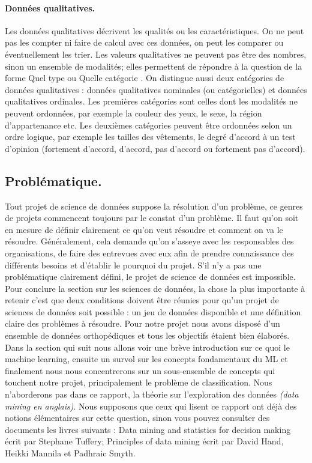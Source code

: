\documentclass[12pt, french]{report}
\begin{document}
\paragraph{Données qualitatives.} 
Les données qualitatives décrivent les qualités ou les caractéristiques. On ne peut pas les compter ni faire de calcul avec ces données, on peut les comparer ou éventuellement les trier. Les valeurs qualitatives ne peuvent pas être des nombres, sinon un ensemble de modalités; elles permettent de répondre à la question de la forme \guillemotleft Quel type \guillemotright ou \guillemotleft Quelle catégorie \guillemotright. On distingue aussi deux catégories de données qualitatives : données qualitatives nominales (ou catégorielles) et données qualitatives ordinales. Les premières catégories sont celles dont les modalités ne peuvent ordonnées, par exemple la couleur des yeux, le sexe, la région d'appartenance etc. Les deuxièmes catégories peuvent être ordonnées selon un ordre logique, par exemple les tailles des vêtements, le degré d'accord à un test d'opinion (fortement d'accord, d'accord, pas d'accord ou fortement pas d'accord).

\subsection{Problématique.}
Tout projet de science de données suppose la résolution d'un problème, ce genres de projets commencent toujours par le constat d'un problème. Il faut qu'on soit en mesure de définir clairement ce qu'on veut résoudre et comment on va le résoudre. Généralement, cela demande qu'on s'asseye avec les responsables des organisations, de faire des entrevues avec eux afin de prendre connaissance des différents besoins et d'établir le pourquoi du projet. S'il n'y a pas une problématique clairement défini, le projet de science de données est impossible. \\

Pour conclure la section sur les sciences de données, la chose la plus importante à retenir c'est que deux conditions doivent être réunies pour qu'un projet de sciences de données soit possible : un jeu de données disponible et une définition claire des problèmes à résoudre. Pour notre projet nous avons disposé d'un ensemble de données orthopédiques et tous les objectifs étaient bien élaborés. \\

Dans la section qui suit nous allons voir une brève introduction sur ce quoi le machine learning, ensuite un survol sur les concepts fondamentaux du ML et finalement nous nous concentrerons sur un sous-ensemble de concepts qui touchent notre projet, principalement le problème de classification. Nous n'aborderons pas dans ce rapport, la théorie sur l'exploration des données \textit{(data mining en anglais)}. Nous supposons que ceux qui lisent ce rapport ont déjà des notions élémentaires sur cette question, sinon vous pouvez consulter des documents les livres suivants : \guillemotleft Data mining and statistics for decision making \guillemotright écrit par Stephane Tuffery; \guillemotleft Principles of data mining \guillemotright  écrit par David Hand, Heikki Mannila et Padhraic Smyth.
\end{document}
